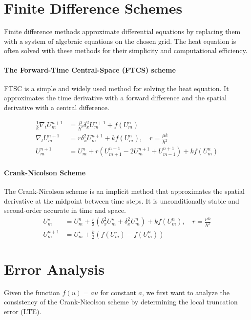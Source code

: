 \section{Finite Difference Schemes}
Finite difference methods approximate differential equations by replacing them with a system of algebraic equations on the chosen grid.
The heat equation is often solved with these methods for their simplicity and computational efficiency.

\paragraph{The Forward-Time Central-Space (FTCS) scheme}
FTSC is a simple and widely used method for solving the heat equation.
It approximates the time derivative with a forward difference and the spatial derivative with a central difference.

\begin{align*}
  \frac{1}{k} \nabla_t U_m^{n+1} & = \frac{\mu}{h^2} \delta_x^2 U_m^{n+1} + f(U_m^n)                                              \\
  \nabla_t U_m^{n+1}             & = r \delta_x^2 U_m^{n+1} + k f(U_m^n), \quad r = \frac{\mu k}{h^2}                             \\
  U_m^{n+1}                      & = U_m^n + r \left( U_{m+1}^{n+1} - 2 U_m^{n+1} + U_{m-1}^{n+1} \right) + k f(U_m^n) \tag{FTCS}
\end{align*}

\paragraph{Crank-Nicolson Scheme}

The Crank-Nicolson scheme is an implicit method that approximates the spatial derivative at the midpoint between time steps. It is unconditionally stable and second-order accurate in time and space.
\begin{align*}
  U_m^\star & = U_m^n + \frac{r}{2} \left( \delta_x^2 U_m^\star + \delta_x^2 U_m^n \right) + k f(U_m^n), \quad r = \frac{\mu k}{h^2} \tag{Crank-Nicolson} \\
  U_m^{n+1} & = U_m^\star + \frac{k}{2} \left( f(U_m^\star) - f(U_m^n) \right)
\end{align*}

\section{Error Analysis}
Given the function \(f(u) = au\) for constant \(a\), we first want to analyze the consistency of the Crank-Nicolson scheme by determining the local truncation error (LTE).

